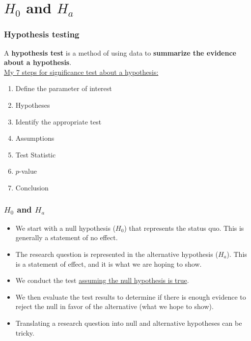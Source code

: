 \section[$H_0$ and $H_a$]{$H_0$ and $H_a$}

\begin{frame}
\frametitle{Hypothesis testing}
A \textbf{hypothesis test} is a method of using data to \textbf{summarize the evidence about a hypothesis}.\\
\vskip20pt
\underline{My 7 steps for significance test about a hypothesis:}
\begin{enumerate}
    \item
    Define the parameter of interest
    \item
    Hypotheses
    \item
    Identify the appropriate test
    \item
    Assumptions
    \item
    Test Statistic
    \item
    $p$-value
    \item
    Conclusion
\end{enumerate}
\end{frame}

\begin{frame}
\frametitle{$H_0$ and $H_a$}
\begin{itemize}
    \item
    We start with a null hypothesis ($H_0$) that represents the status quo.  This is generally a statement of no effect.
    \item
    The research question is represented in the alternative hypothesis ($H_a$).  This is a statement of effect, and it is what we are hoping to show.
    \item
    We conduct the test \underline{assuming the null hypothesis is true}.
    \item
    We then evaluate the test results to determine if there is enough evidence to reject the null in favor of the alternative (what we hope to show).
    \item
    Translating a research question into null and alternative hypotheses can be tricky.
\end{itemize}
\end{frame}


